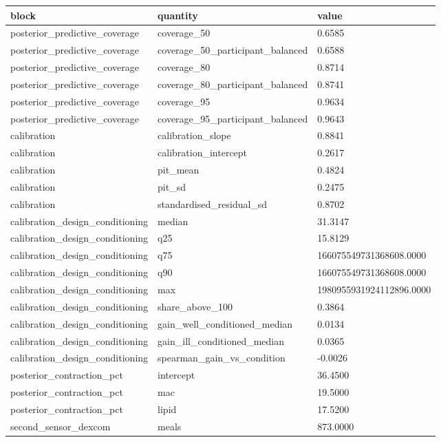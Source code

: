 {\footnotesize\setlength{\tabcolsep}{3pt}
\begin{longtable}{lll}
\toprule
\textbf{block} & \textbf{quantity} & \textbf{value} \\
\midrule
\endhead
posterior\_predictive\_coverage & coverage\_50 & 0.6585 \\
posterior\_predictive\_coverage & coverage\_50\_participant\_balanced & 0.6588 \\
posterior\_predictive\_coverage & coverage\_80 & 0.8714 \\
posterior\_predictive\_coverage & coverage\_80\_participant\_balanced & 0.8741 \\
posterior\_predictive\_coverage & coverage\_95 & 0.9634 \\
posterior\_predictive\_coverage & coverage\_95\_participant\_balanced & 0.9643 \\
calibration & calibration\_slope & 0.8841 \\
calibration & calibration\_intercept & 0.2617 \\
calibration & pit\_mean & 0.4824 \\
calibration & pit\_sd & 0.2475 \\
calibration & standardised\_residual\_sd & 0.8702 \\
calibration\_design\_conditioning & median & 31.3147 \\
calibration\_design\_conditioning & q25 & 15.8129 \\
calibration\_design\_conditioning & q75 & 166075549731368608.0000 \\
calibration\_design\_conditioning & q90 & 166075549731368608.0000 \\
calibration\_design\_conditioning & max & 1980955931924112896.0000 \\
calibration\_design\_conditioning & share\_above\_100 & 0.3864 \\
calibration\_design\_conditioning & gain\_well\_conditioned\_median & 0.0134 \\
calibration\_design\_conditioning & gain\_ill\_conditioned\_median & 0.0365 \\
calibration\_design\_conditioning & spearman\_gain\_vs\_condition & -0.0026 \\
posterior\_contraction\_pct & intercept & 36.4500 \\
posterior\_contraction\_pct & mac & 19.5000 \\
posterior\_contraction\_pct & lipid & 17.5200 \\
second\_sensor\_dexcom & meals & 873.0000 \\

\end{longtable}}
